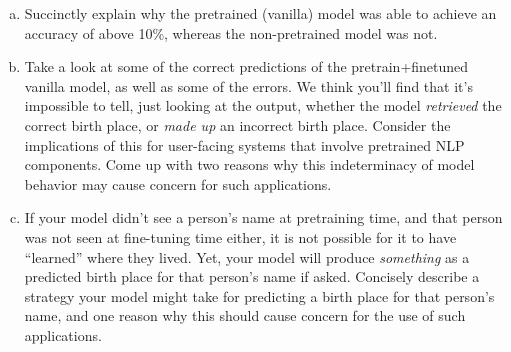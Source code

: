 \begin{enumerate}[(a)]

\item {}
Succinctly explain why the pretrained (vanilla) model was able to achieve an accuracy of above 10\%, whereas the non-pretrained model was not.

\begin{answer}
\end{answer}

\item {}
Take a look at some of the correct predictions of the pretrain+finetuned vanilla model, as well as some of the errors.
We think you'll find that it's impossible to tell, just looking at the output, whether the model \textit{retrieved} the correct birth place, or \textit{made up} an incorrect birth place.
Consider the implications of this for user-facing systems that involve pretrained NLP components.
Come up with two reasons why this indeterminacy of model behavior may cause concern for such applications.

\begin{answer}
\end{answer}

\item {}
If your model didn't see a person's name at pretraining time, and that person was not seen at fine-tuning time either, it is not possible for it to have ``learned'' where they lived.
Yet, your model will produce \textit{something} as a predicted birth place for that person's name if asked.
Concisely describe a strategy your model might take for predicting a birth place for that person's name, and one reason why this should cause concern for the use of such applications.
\end{enumerate}

\begin{answer}
\end{answer}



 
